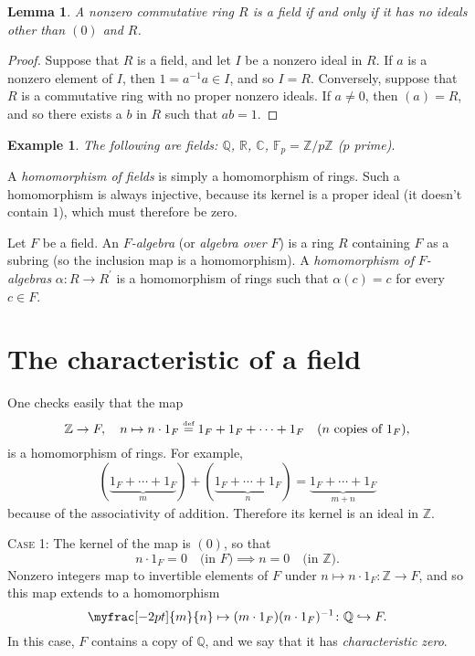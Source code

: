 \documentclass[a4paper,11pt,final,openany]{memoir}
\newtheorem{lemma}[X]{Lemma}
\newtheorem{example}[X]{Example}
\theoremstyle{nonumberplain}
\newtheorem{proof}{Proof.}
\begin{document}
\begin{lemma}
\label{ef1}A nonzero commutative ring $R$ is a field if and only if it has no
ideals other than $(0)$ and $R$.
\end{lemma}

\begin{proof}
Suppose that $R$ is a field, and let $I$ be a nonzero ideal in $R$. If $a$ is
a nonzero element of $I$, then $1=a^{-1}a\in I$, and so $I=R$. Conversely,
suppose that $R$ is a commutative ring with no proper nonzero ideals. If
$a\neq0$, then $(a)=R$, and so there exists a $b$ in $R$ such that $ab=1$.
\end{proof}

\begin{example}
\label{ef2}The following are fields: $\mathbb{Q}$, $\mathbb{R}$, $\mathbb{C}$,
$\mathbb{F}_{p}=\mathbb{Z}/p\mathbb{Z}$ ($p$ prime)$.$
\end{example}

A \emph{homomorphism of fields}%
is simply a homomorphism of rings. Such a homomorphism is always injective,
because its kernel is a proper ideal (it doesn't contain $1$), which must
therefore be zero.

Let $F$ be a field. An $F$\emph{-algebra}%
(or \emph{algebra over }$F$)%
is a ring $R$ containing $F$ as a subring (so the inclusion map is a
homomorphism). A \emph{homomorphism of }$F$\emph{-algebras} $\alpha\colon
R\rightarrow R^{\prime}$%
is a homomorphism of rings such that $\alpha(c)=c$ for every $c\in F$.

\section{The characteristic of a field}

One checks easily that the map
\[
\mathbb{Z}\rightarrow F,\quad n\mapsto n\cdot1_{F}\overset{\textup{{\tiny def}%
}}{=}1_{F}+1_{F}+\cdots+1_{F}\quad(n\text{ copies of }1_{F}),
\]
is a homomorphism of rings. For example,%
\[
(\underbrace{1_{F}+\cdots+1_{F}}_{m})+(\underbrace{1_{F}+\cdots+1_{F}}%
_{n})=\underbrace{1_{F}+\cdots+1_{F}}_{m+n}%
\]
because of the associativity of addition. Therefore its kernel is an ideal in
$\mathbb{Z}{}$.

\textsc{Case 1:\/} The kernel of the map is $(0)$, so that
\[
n\cdot1_{F}=0\quad\text{(in }F\text{)}\implies n=0\quad\text{(in }%
\mathbb{Z}\text{).}%
\]
Nonzero integers map to invertible elements of $F$ under $n\mapsto n\cdot
1_{F}\colon\mathbb{Z}{}\rightarrow F$, and so this map extends to a
homomorphism
\[
\myfrac[-2pt]{m}{n}\mapsto(m\cdot1_{F})(n\cdot1_{F})^{-1}\colon\mathbb{Q}%
\hookrightarrow F.
\]
In this case, $F$ contains a copy of $\mathbb{Q}$, and we say that it has
\emph{characteristic zero}.%
%
\end{document}
